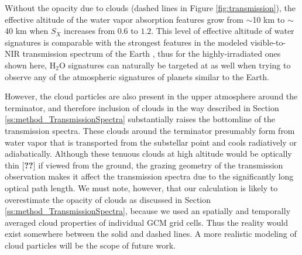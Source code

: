 \documentclass[11pt,numberedappendix,twocolappendix,]{emulateapj}
\def\water{H$_2$O }
\def\memo#1{\color{red}$[${\bf #1}$]$ \color{black}}
\begin{document}
Without the opacity due to clouds (dashed lines in Figure \ref{fig:transmission}), the effective altitude of the water vapor absorption features grow from $\sim $10 km to $\sim $40 km when $S_X$ increases from $0.6$ to $1.2$. 
This level of effective altitude of water signatures is comparable with the strongest features in the modeled visible-to-NIR transmission spectrum of the Earth \citep[e.g.,][]{Kaltenegger2009}, thus for the highly-irradiated ones shown here, \water signatures can naturally be targeted at as well when trying to observe any of the atmospheric signatures of planets similar to the Earth. 

However, the cloud particles are also present in the upper atmosphere around the terminator, and therefore inclusion of clouds in the way described in Section \ref{ss:method_TransmissionSpectra} substantially raises the bottomline of the transmission spectra. 
%
These clouds around the terminator presumably form from water vapor that is transported from the substellar point and cools radiatively or adiabatically. 
%
%
Although these tenuous clouds at high altitude would be optically thin \memo{??} if viewed  from the ground, the grazing geometry of the transmission observation makes it affect the transmission spectra due to the significantly long optical path length. 
We must note, however, that our calculation is likely to overestimate the opacity of clouds as discussed in Section \ref{ss:method_TransmissionSpectra}, because we used an spatially and temporally averaged cloud properties of individual GCM grid cells. 
Thus the reality would exist somewhere between the solid and dashed lines. 
A more realistic modeling of cloud particles will be the scope of future work. 
\end{document}
